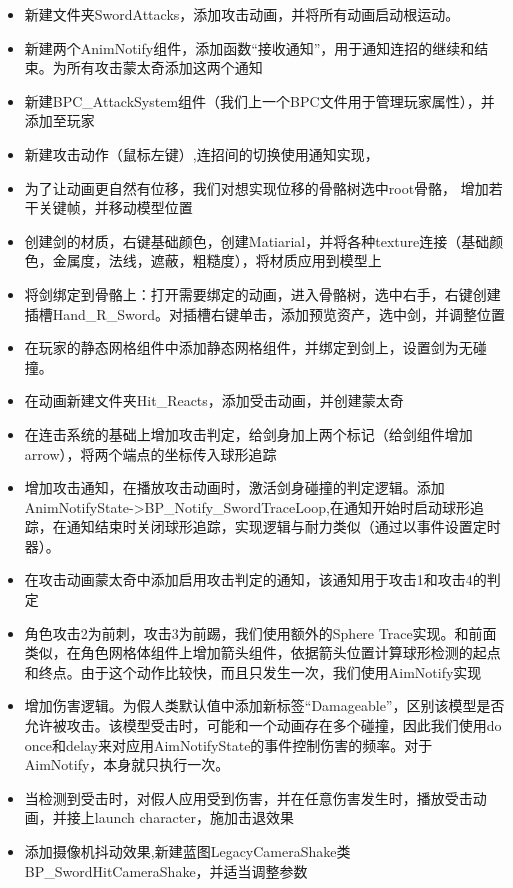 \documentclass[11pt,oneside]{book}
\begin{document}
\begin{itemize}
    \item 新建文件夹SwordAttacks，添加攻击动画，并将所有动画启动根运动。
    \item 新建两个AnimNotify组件，添加函数“接收通知”，用于通知连招的继续和结束。为所有攻击蒙太奇添加这两个通知
    \item 新建BPC\_AttackSystem组件（我们上一个BPC文件用于管理玩家属性），并添加至玩家
    \item 新建攻击动作（鼠标左键）,连招间的切换使用通知实现，
    \item 为了让动画更自然有位移，我们对想实现位移的骨骼树选中root骨骼， 增加若干关键帧，并移动模型位置
    \item 创建剑的材质，右键基础颜色，创建Matiarial，并将各种texture连接（基础颜色，金属度，法线，遮蔽，粗糙度），将材质应用到模型上
    \item 将剑绑定到骨骼上：打开需要绑定的动画，进入骨骼树，选中右手，右键创建插槽Hand\_R\_Sword。对插槽右键单击，添加预览资产，选中剑，并调整位置
    \item 在玩家的静态网格组件中添加静态网格组件，并绑定到剑上，设置剑为无碰撞。
    \item 在动画新建文件夹Hit\_Reacts，添加受击动画，并创建蒙太奇
    \item 在连击系统的基础上增加攻击判定，给剑身加上两个标记（给剑组件增加arrow），将两个端点的坐标传入球形追踪
    \item 增加攻击通知，在播放攻击动画时，激活剑身碰撞的判定逻辑。添加AnimNotifyState->BP\_Notify\_SwordTraceLoop,在通知开始时启动球形追踪，在通知结束时关闭球形追踪，实现逻辑与耐力类似（通过以事件设置定时器）。
    \item 在攻击动画蒙太奇中添加启用攻击判定的通知，该通知用于攻击1和攻击4的判定
    \item 角色攻击2为前刺，攻击3为前踢，我们使用额外的Sphere Trace实现。和前面类似，在角色网格体组件上增加箭头组件，依据箭头位置计算球形检测的起点和终点。由于这个动作比较快，而且只发生一次，我们使用AimNotify实现
    \item 增加伤害逻辑。为假人类默认值中添加新标签“Damageable”，区别该模型是否允许被攻击。该模型受击时，可能和一个动画存在多个碰撞，因此我们使用do once和delay来对应用AimNotifyState的事件控制伤害的频率。对于AimNotify，本身就只执行一次。
    \item 当检测到受击时，对假人应用受到伤害，并在任意伤害发生时，播放受击动画，并接上launch character，施加击退效果
    \item 添加摄像机抖动效果,新建蓝图LegacyCameraShake类BP\_SwordHitCameraShake，并适当调整参数

\end{itemize}
\end{document}
